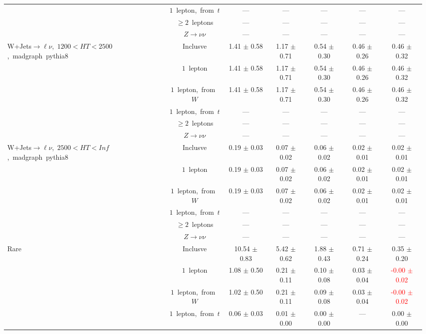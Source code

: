 \documentclass{article}
\begin{document}
\begin{longtable}{|l|c|c|c|c|c|c|}
 & $1$~lepton,~from~$t$  & ---  & ---  & ---  & ---  & --- \\* 
 & $\ge2$~leptons  & ---  & ---  & ---  & ---  & --- \\* 
 & $Z\rightarrow\nu\nu$  & ---  & ---  & ---  & ---  & --- \\* 
\hline 
\multirow{6}{*}{W+Jets$\rightarrow\ell\nu$,~$1200<HT<2500$,~madgraph~pythia8} & Inclusve  & 1.41 $\pm$ 0.58  & 1.17 $\pm$ 0.71  & 0.54 $\pm$ 0.30  & 0.46 $\pm$ 0.26  & 0.46 $\pm$ 0.32 \\* 
 & $1$~lepton  & 1.41 $\pm$ 0.58  & 1.17 $\pm$ 0.71  & 0.54 $\pm$ 0.30  & 0.46 $\pm$ 0.26  & 0.46 $\pm$ 0.32 \\* 
 & $1$~lepton,~from~$W$  & 1.41 $\pm$ 0.58  & 1.17 $\pm$ 0.71  & 0.54 $\pm$ 0.30  & 0.46 $\pm$ 0.26  & 0.46 $\pm$ 0.32 \\* 
 & $1$~lepton,~from~$t$  & ---  & ---  & ---  & ---  & --- \\* 
 & $\ge2$~leptons  & ---  & ---  & ---  & ---  & --- \\* 
 & $Z\rightarrow\nu\nu$  & ---  & ---  & ---  & ---  & --- \\* 
\hline 
\multirow{6}{*}{W+Jets$\rightarrow\ell\nu$,~$2500<HT<Inf$,~madgraph~pythia8} & Inclusve  & 0.19 $\pm$ 0.03  & 0.07 $\pm$ 0.02  & 0.06 $\pm$ 0.02  & 0.02 $\pm$ 0.01  & 0.02 $\pm$ 0.01 \\* 
 & $1$~lepton  & 0.19 $\pm$ 0.03  & 0.07 $\pm$ 0.02  & 0.06 $\pm$ 0.02  & 0.02 $\pm$ 0.01  & 0.02 $\pm$ 0.01 \\* 
 & $1$~lepton,~from~$W$  & 0.19 $\pm$ 0.03  & 0.07 $\pm$ 0.02  & 0.06 $\pm$ 0.02  & 0.02 $\pm$ 0.01  & 0.02 $\pm$ 0.01 \\* 
 & $1$~lepton,~from~$t$  & ---  & ---  & ---  & ---  & --- \\* 
 & $\ge2$~leptons  & ---  & ---  & ---  & ---  & --- \\* 
 & $Z\rightarrow\nu\nu$  & ---  & ---  & ---  & ---  & --- \\* 
\hline 
\multirow{6}{*}{Rare} & Inclusve  & 10.54 $\pm$ 0.83  & 5.42 $\pm$ 0.62  & 1.88 $\pm$ 0.43  & 0.71 $\pm$ 0.24  & 0.35 $\pm$ 0.20 \\* 
 & $1$~lepton  & 1.08 $\pm$ 0.50  & 0.21 $\pm$ 0.11  & 0.10 $\pm$ 0.08  & 0.03 $\pm$ 0.04  & \textcolor{red}{ -0.00 $\pm$ 0.02 } \\* 
 & $1$~lepton,~from~$W$  & 1.02 $\pm$ 0.50  & 0.21 $\pm$ 0.11  & 0.09 $\pm$ 0.08  & 0.03 $\pm$ 0.04  & \textcolor{red}{ -0.00 $\pm$ 0.02 } \\* 
 & $1$~lepton,~from~$t$  & 0.06 $\pm$ 0.03  & 0.01 $\pm$ 0.00  & 0.00 $\pm$ 0.00  & ---  & 0.00 $\pm$ 0.00 \\* 

\end{longtable}
\end{document}
